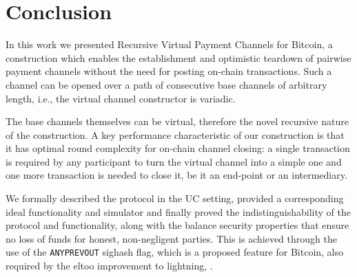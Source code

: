 \section{Conclusion}

  In this work we presented Recursive Virtual Payment Channels for Bitcoin,
  a construction which enables the establishment and optimistic teardown of pairwise payment channels without the need for
  posting on-chain transactions. Such a channel can be opened over a path of consecutive base
  channels of arbitrary length, i.e., the virtual channel constructor is variadic. 

  The base channels themselves
  can be virtual, therefore the novel recursive nature of the construction. 
  A key performance characteristic of our construction is that it has optimal
  round complexity for on-chain channel closing: a single transaction is required
  by any participant to turn the virtual channel into a simple one and one more
  transaction is needed to close it, be it an end-point or an intermediary. 
  
  We formally described the protocol in the UC setting, provided a corresponding
  ideal functionality and simulator and finally proved the indistinguishability
  of the protocol and functionality, along with the balance security properties
  that ensure no loss of funds for honest, non-negligent parties. This is
  achieved through the use of the \texttt{ANYPREVOUT} sighash flag, which is a
  proposed feature for Bitcoin, also required by the eltoo improvement to lightning, 
  \cite{eltoo}. 

\newpage
